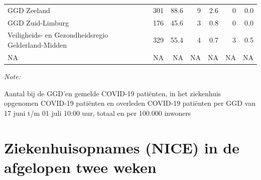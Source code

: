 \documentclass[
  english,
  man,floatsintext]{apa6}
\begin{document}
\begin{table}
\begin{threeparttable}
\begin{tabular}{lrrrrrr}
GGD Zeeland & 301 & 88.6 & 9 & 2.6 & 0 & 0.0\\
GGD Zuid-Limburg & 176 & 45.6 & 3 & 0.8 & 0 & 0.0\\
Veiligheids- en Gezondheidsregio Gelderland-Midden & 329 & 55.4 & 4 & 0.7 & 3 & 0.5\\
NA & NA & NA & NA & NA & NA & NA\\
\bottomrule
\end{tabular}
\begin{tablenotes}
\item \textit{Note: } 
\item Aantal bij de GGD’en gemelde COVID-19 patiënten, in het ziekenhuis opgenomen COVID-19 patiënten en overleden COVID-19 patiënten per GGD van 17 juni t/m 01 juli 10:00 uur, totaal en per 100.000 inwoners
\end{tablenotes}
\end{threeparttable}
\endgroup{}
\end{table}

\newpage

\hypertarget{ziekenhuisopnames-nice-in-de-afgelopen-twee-weken}{%
\section{Ziekenhuisopnames (NICE) in de afgelopen twee weken}\label{ziekenhuisopnames-nice-in-de-afgelopen-twee-weken}}
\end{document}
